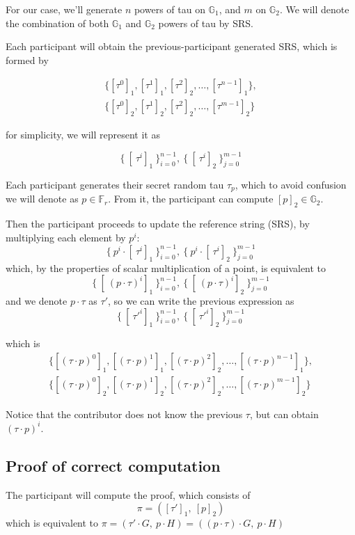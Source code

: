 \documentclass{article}
\begin{document}
For our case, we'll generate $n$ powers of tau on $\mathbb{G}_1$, and $m$ on $\mathbb{G}_2$. We will denote the combination of both $\mathbb{G}_1$ and $\mathbb{G}_2$ powers of tau by SRS.

Each participant will obtain the previous-participant generated SRS, which is formed by

\begin{align*}
        \{ [\tau^0]_1, [\tau^1]_1, [\tau^2]_2, \ldots, [\tau^{n-1}]_1 \},\\
        \{ [\tau^0]_2, [\tau^1]_2, [\tau^2]_2, \ldots, [\tau^{m-1}]_2 \}
\end{align*}

for simplicity, we will represent it as

$$\{~[~\tau^i]_1~\}^{n-1}_{i=0},~\{~[~\tau^i]_2~\}^{m-1}_{j=0}$$


Each participant generates their secret random tau $\tau_p$, which to avoid confusion we will denote as $p \in \mathbb{F}_r$. From it, the participant can compute $[p]_2 \in \mathbb{G}_2$.

Then the participant proceeds to update the reference string (SRS), by multiplying each element by $p^i$:
$$\{~ p^i \cdot [~ \tau^i]_1~\}^{n-1}_{i=0},~\{~ p^i \cdot [~\tau^i]_2~\}^{m-1}_{j=0}$$
which, by the properties of scalar multiplication of a point, is equivalent to
$$\{~ [~ (p \cdot \tau)^i]_1~\}^{n-1}_{i=0},~\{~ [~ (p \cdot \tau)^i]_2~\}^{m-1}_{j=0}$$
and we denote $p \cdot \tau$ as $\tau'$, so we can write the previous expression as
$$\{~[~\tau'^i]_1~\}^{n-1}_{i=0},~\{~[~\tau'^i]_2~\}^{m-1}_{j=0}$$

which is
\begin{align*}
        \{ [(\tau \cdot p)^0]_1, [(\tau \cdot p)^1]_1, [(\tau \cdot p)^2]_2, \ldots, [(\tau \cdot p)^{n-1}]_1 \},\\
        \{ [(\tau \cdot p)^0]_2, [(\tau \cdot p)^1]_2, [(\tau \cdot p)^2]_2, \ldots, [(\tau \cdot p)^{m-1}]_2 \}
\end{align*}

Notice that the contributor does not know the previous $\tau$, but can obtain $(\tau \cdot p)^i$.


\subsection{Proof of correct computation}
The participant will compute the proof, which consists of
$$\pi = ([\tau']_1,~[p]_2)$$
which is equivalent to $\pi = (\tau' \cdot G,~p \cdot H) = ((p \cdot \tau) \cdot G,~p \cdot H)$
\end{document}
